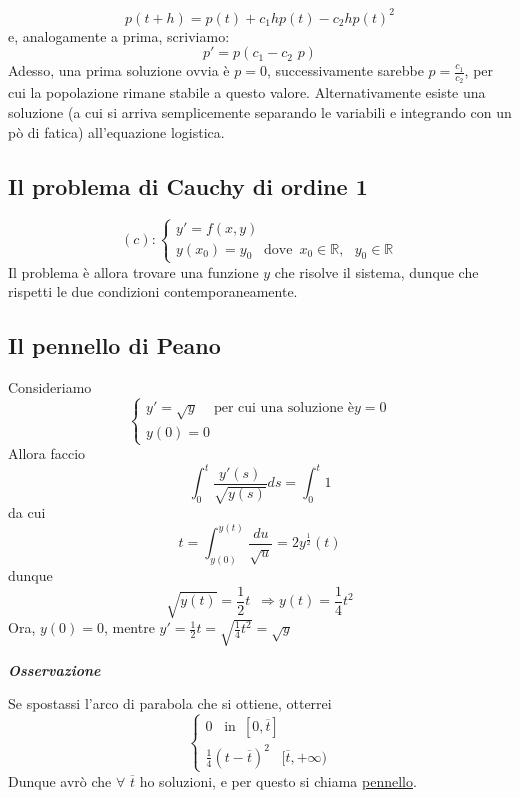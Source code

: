 \documentclass{article}
\theoremstyle{definition}
\newcommand{\R}{\mathbb{R}}
\begin{document}
\begin{equation}
    p(t+h)=p(t)+c_1hp(t)-c_2 hp(t)^2
\end{equation}
e, analogamente a prima, scriviamo:
\begin{equation}
    p'=p(c_1-c_2 \,\, p)
\end{equation}
Adesso, una prima soluzione ovvia è $p=0$, successivamente sarebbe $p=\frac{c_1}{c_2}$, per cui la popolazione rimane stabile a questo valore. Alternativamente esiste una soluzione (a cui si arriva semplicemente separando le variabili e integrando con un pò di fatica) all'equazione logistica.

\subsection{Il problema di Cauchy di ordine 1}
\begin{equation}
    (c): \begin{cases}
        y'=f(x,y) \\
        y(x_0)=y_0 \,\,\,\,\, \mbox{dove} \,\,\, x_0 \in \R, \,\,\,\, y_0 \in \R
    \end{cases}
\end{equation}
Il problema è allora trovare una funzione $y$ che risolve il sistema, dunque che rispetti le due condizioni contemporaneamente.
\\
\subsection{Il pennello di Peano}
Consideriamo
\begin{equation}
    \begin{cases}
        y'=\sqrt{y}\,\,\,\,\,\,\, \mbox{per cui una soluzione è} y=0 \\
        y(0)=0
    \end{cases}
\end{equation}
Allora faccio 
\begin{equation}
    \int_0^t \frac{y'(s)}{\sqrt{y(s)}}ds=\int_0^t 1
\end{equation}
da cui
\begin{equation}
    t=\int_{y(0)}^{y(t)}\frac{du}{\sqrt{u}}=2y^{\frac{1}{2}}(t)
\end{equation}
dunque
\begin{equation}
    \sqrt{y(t)}=\frac{1}{2}t \,\,\, \Longrightarrow y(t)=\frac{1}{4}t^2
\end{equation}
Ora, $y(0)=0$, mentre $y'=\frac{1}{2}t=\sqrt{\frac{1}{4}t^2}=\sqrt{y}$
\begin{center}
    \textbf{\textit{Osservazione}}
\end{center}
Se spostassi l'arco di parabola che si ottiene, otterrei
\begin{equation}
    \begin{cases}
        0 \,\,\,\,\, \mbox{in} \,\,\, [0,\overline{t}] \\
        \frac{1}{4}(t-\overline{t})^2 \,\,\,\,\, [\overline{t},+\infty)
    \end{cases}
\end{equation}
Dunque avrò che $\forall \,\, \overline{t}$ ho soluzioni, e per questo si chiama \underline{pennello}.
\end{document}
